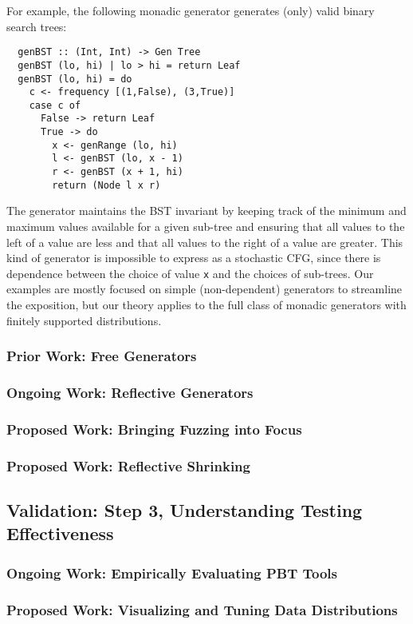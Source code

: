 For example, the following monadic generator generates (only) valid binary
search trees:
\begin{lstlisting}
  genBST :: (Int, Int) -> Gen Tree
  genBST (lo, hi) | lo > hi = return Leaf
  genBST (lo, hi) = do
    c <- frequency [(1,False), (3,True)]
    case c of
      False -> return Leaf
      True -> do
        x <- genRange (lo, hi)
        l <- genBST (lo, x - 1)
        r <- genBST (x + 1, hi)
        return (Node l x r)
\end{lstlisting}
\noindent The generator maintains the BST invariant by keeping track of the
minimum and maximum values available for a given sub-tree and ensuring that all
values to the left of a value are less and that all values to the right of a
value are greater.  This kind of generator is impossible to express as a
stochastic CFG, since there is dependence between the choice of value
\lstinline{x} and the choices of sub-trees. Our examples are mostly focused on
simple (non-dependent) generators to streamline the exposition, but our theory
applies to the full class of monadic generators with finitely supported
distributions.

\subsubsection{Prior Work: Free Generators}
\subsubsection{Ongoing Work: Reflective Generators}
\subsubsection{Proposed Work: Bringing Fuzzing into Focus}
\subsubsection{Proposed Work: Reflective Shrinking}

\subsection{Validation: Step 3, Understanding Testing Effectiveness }
\subsubsection{Ongoing Work: Empirically Evaluating PBT Tools}

\subsubsection{Proposed Work: Visualizing and Tuning Data Distributions}

